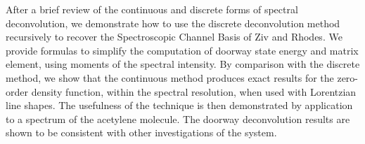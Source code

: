 \documentclass[12pt]{mitthesis}
\begin{document}
After a brief review of the continuous and discrete forms of spectral
deconvolution, we demonstrate how to use the discrete deconvolution
method recursively to recover the Spectroscopic Channel Basis of Ziv
and Rhodes.  We provide formulas to simplify the computation of
doorway state energy and matrix element, using moments of the spectral
intensity.  By comparison with the discrete method, we show that the
continuous method produces exact results for the zero-order density
function, within the spectral resolution, when used with Lorentzian
line shapes.  
The usefulness of
the technique is then demonstrated by application to a spectrum of the
acetylene molecule.  The doorway deconvolution results are shown to be
consistent with other investigations of the system.
\end{document}
